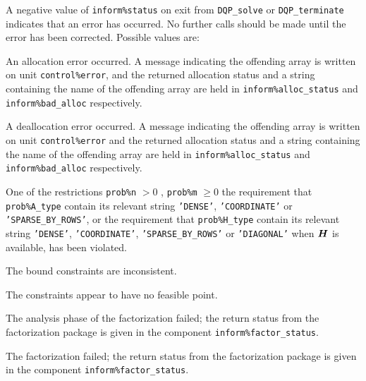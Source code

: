 \documentclass{galahad}
\newcommand{\packagename}{DQP}
\begin{document}

\galerrors
A negative value of {\tt inform\%status} on exit from
{\tt \packagename\_solve}
or
{\tt \packagename\_terminate}
indicates that an error has occurred. No further calls should be made
until the error has been corrected. Possible values are:

\begin{description}

 An allocation error occurred. A message indicating
the offending
array is written on unit {\tt control\%error}, and the returned allocation
status and a string containing the name of the offending array
are held in {\tt inform\%alloc\_\-status}
and {\tt inform\%bad\_alloc} respectively.

 A deallocation error occurred.
A message indicating the offending
array is written on unit {\tt control\%error} and the returned allocation
status and a string containing the name of the offending array
are held in {\tt inform\%alloc\_\-status}
and {\tt inform\%bad\_alloc} respectively.

 One of the restrictions
 {\tt prob\%n} $> 0$ ,  {\tt prob\%m} $\geq 0$
    the requirement that {\tt prob\%A\_type} contain its relevant string
    {\tt 'DENSE'}, {\tt 'COORDINATE'} or {\tt 'SPARSE\_BY\_ROWS'},
    or the requirement that
    {\tt prob\%H\_type} contain its relevant string
    {\tt 'DENSE'}, {\tt 'COORDINATE'}, {\tt 'SPARSE\_BY\_ROWS'}
    or {\tt 'DIAGONAL'} when ${\bm{H}}$ is available,
    has been violated.


 The bound constraints are inconsistent.

 The constraints appear to have no feasible point.

 The analysis phase of the factorization failed;
  the return status from the factorization
    package is given in the component {\tt inform\%fac\-t\-or\_status}.

 The factorization failed; the return status
  from the factorization
    package is given in the component {\tt inform\%fac\-t\-or\_status}.


\end{description}
\end{document}

